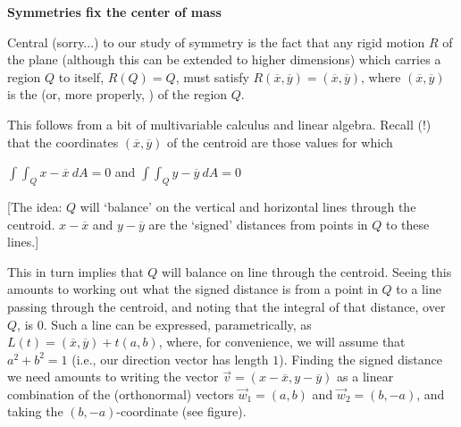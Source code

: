 






\def\ctln{\centerline}
\def\ssk{\smallskip}
\def\msk{\medskip}
\def\bsk{\bigskip}
\def\ubr{\underbar}
\def\ovln{\overline}
\def\bbr{{\rm I\hskip-2pt R}}

\parindent=0pt

\centerline{\bf Symmetries fix the center of mass}

\medskip

Central (sorry...) to our study of symmetry is the fact that
any rigid motion $R$ of the plane (although this can be extended to higher
dimensions) which carries a region $Q$ to itself, $R(Q)=Q$, must satisfy
$R(\overline{x},\overline{y})=(\overline{x},\overline{y})$, where
$(\overline{x},\overline{y})$ is the 
\ubr{center}   (or, more properly, 
) of the region $Q$.

\medskip

This follows from a bit of multivariable calculus and linear algebra.
Recall (!) that the coordinates $(\overline{x},\overline{y})$ of the centroid 
are those values for which

\smallskip

\ctln{$\int\int_Q x-\overline{x}\ dA = 0$ and $\int\int_Q y-\overline{y}\ dA = 0$}

\ssk

[The idea: $Q$ will `balance' on the vertical and horizontal lines through the centroid.
$x-\ovln{x}$ and $y-\ovln{y}$ are the `signed' distances from points in $Q$ to these lines.]

\msk

This in turn implies that $Q$ will balance on \ubr{any} line through the centroid. Seeing
this amounts to working out what the signed distance is from a point in $Q$ to a line
passing through the centroid, and noting that the integral of that distance, over $Q$, 
is \ubr{also} $0$. Such a line can be expressed, parametrically, as 
$L(t)=(\ovln{x},\ovln{y})+t(a,b)$, where, for convenience, we will assume that
$a^2+b^2=1$ (i.e., our direction vector has length $1$). Finding the signed distance 
we need amounts to writing the vector $\vec{v}=(x-\ovln{x},y-\ovln{y})$ as a linear combination
of the (orthonormal) vectors $\vec{w}_1=(a,b)$ and $\vec{w}_2=(b,-a)$, and taking the 
$(b,-a)$-coordinate (see figure). 

\msk

\leavevmode

